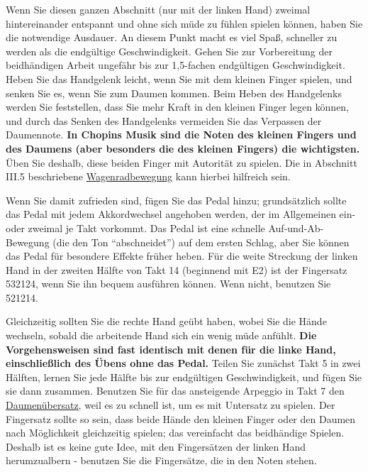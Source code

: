 Wenn Sie diesen ganzen Abschnitt (nur mit der linken Hand) zweimal hintereinander entspannt und ohne sich müde zu fühlen spielen können, haben Sie die notwendige Ausdauer.
An diesem Punkt macht es viel Spaß, schneller zu werden als die endgültige Geschwindigkeit.
Gehen Sie zur Vorbereitung der beidhändigen Arbeit ungefähr bis zur 1,5-fachen endgültigen Geschwindigkeit.
Heben Sie das Handgelenk leicht, wenn Sie mit dem kleinen Finger spielen, und senken Sie es, wenn Sie zum Daumen kommen.
Beim Heben des Handgelenks werden Sie feststellen, dass Sie mehr Kraft in den kleinen Finger legen können, und durch das Senken des Handgelenks vermeiden Sie das Verpassen der Daumennote.
\textbf{In Chopins Musik sind die Noten des kleinen Fingers und des Daumens (aber besonders die des kleinen Fingers) die wichtigsten.}
Üben Sie deshalb, diese beiden Finger mit Autorität zu spielen.
Die in Abschnitt III.5 beschriebene \hyperlink{c1iii5wagen}{Wagenradbewegung} kann hierbei hilfreich sein.

Wenn Sie damit zufrieden sind, fügen Sie das Pedal hinzu; grundsätzlich sollte das Pedal mit jedem Akkordwechsel angehoben werden, der im Allgemeinen ein- oder zweimal je Takt vorkommt.
Das Pedal ist eine schnelle Auf-und-Ab-Bewegung (die den Ton \enquote{abschneidet}) auf dem ersten Schlag, aber Sie können das Pedal für besondere Effekte früher heben.
Für die weite Streckung der linken Hand in der zweiten Hälfte von Takt 14 (beginnend mit E2) ist der Fingersatz 532124, wenn Sie ihn bequem ausführen können.
Wenn nicht, benutzen Sie 521214.

Gleichzeitig sollten Sie die rechte Hand geübt haben, wobei Sie die Hände wechseln, sobald die arbeitende Hand sich ein wenig müde anfühlt.
\textbf{Die Vorgehensweisen sind fast identisch mit denen für die linke Hand, einschließlich des Übens ohne das Pedal.}
Teilen Sie zunächst Takt 5 in zwei Hälften, lernen Sie jede Hälfte bis zur endgültigen Geschwindigkeit, und fügen Sie sie dann zusammen.
Benutzen Sie für das ansteigende Arpeggio in Takt 7 den \hyperlink{c1iii5a}{Daumenübersatz}, weil es zu schnell ist, um es mit Untersatz zu spielen.
Der Fingersatz sollte so sein, dass beide Hände den kleinen Finger oder den Daumen nach Möglichkeit gleichzeitig spielen; das vereinfacht das beidhändige Spielen.
Deshalb ist es keine gute Idee, mit den Fingersätzen der linken Hand herumzualbern - benutzen Sie die Fingersätze, die in den Noten stehen.

